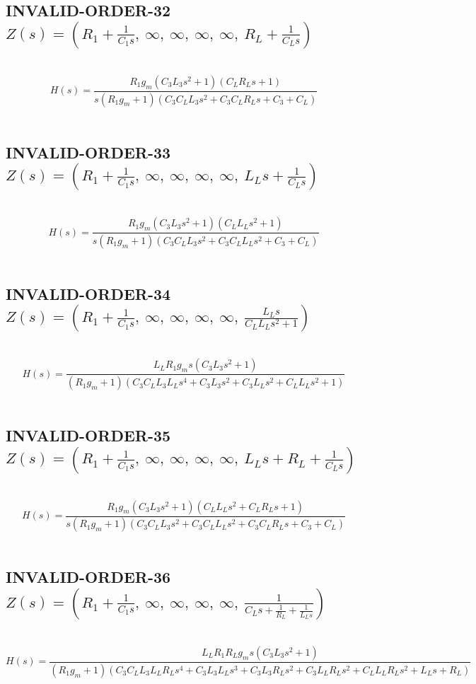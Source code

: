 \documentclass{article}
\begin{document}
\subsection{INVALID-ORDER-32 $Z(s) = \left( R_{1} + \frac{1}{C_{1} s}, \  \infty, \  \infty, \  \infty, \  \infty, \  R_{L} + \frac{1}{C_{L} s}\right)$ } \ 
\textbf{\[H(s) = \frac{R_{1} g_{m} \left(C_{3} L_{3} s^{2} + 1\right) \left(C_{L} R_{L} s + 1\right)}{s \left(R_{1} g_{m} + 1\right) \left(C_{3} C_{L} L_{3} s^{2} + C_{3} C_{L} R_{L} s + C_{3} + C_{L}\right)}\] } \ 
\subsection{INVALID-ORDER-33 $Z(s) = \left( R_{1} + \frac{1}{C_{1} s}, \  \infty, \  \infty, \  \infty, \  \infty, \  L_{L} s + \frac{1}{C_{L} s}\right)$ } \ 
\textbf{\[H(s) = \frac{R_{1} g_{m} \left(C_{3} L_{3} s^{2} + 1\right) \left(C_{L} L_{L} s^{2} + 1\right)}{s \left(R_{1} g_{m} + 1\right) \left(C_{3} C_{L} L_{3} s^{2} + C_{3} C_{L} L_{L} s^{2} + C_{3} + C_{L}\right)}\] } \ 
\subsection{INVALID-ORDER-34 $Z(s) = \left( R_{1} + \frac{1}{C_{1} s}, \  \infty, \  \infty, \  \infty, \  \infty, \  \frac{L_{L} s}{C_{L} L_{L} s^{2} + 1}\right)$ } \ 
\textbf{\[H(s) = \frac{L_{L} R_{1} g_{m} s \left(C_{3} L_{3} s^{2} + 1\right)}{\left(R_{1} g_{m} + 1\right) \left(C_{3} C_{L} L_{3} L_{L} s^{4} + C_{3} L_{3} s^{2} + C_{3} L_{L} s^{2} + C_{L} L_{L} s^{2} + 1\right)}\] } \ 
\subsection{INVALID-ORDER-35 $Z(s) = \left( R_{1} + \frac{1}{C_{1} s}, \  \infty, \  \infty, \  \infty, \  \infty, \  L_{L} s + R_{L} + \frac{1}{C_{L} s}\right)$ } \ 
\textbf{\[H(s) = \frac{R_{1} g_{m} \left(C_{3} L_{3} s^{2} + 1\right) \left(C_{L} L_{L} s^{2} + C_{L} R_{L} s + 1\right)}{s \left(R_{1} g_{m} + 1\right) \left(C_{3} C_{L} L_{3} s^{2} + C_{3} C_{L} L_{L} s^{2} + C_{3} C_{L} R_{L} s + C_{3} + C_{L}\right)}\] } \ 
\subsection{INVALID-ORDER-36 $Z(s) = \left( R_{1} + \frac{1}{C_{1} s}, \  \infty, \  \infty, \  \infty, \  \infty, \  \frac{1}{C_{L} s + \frac{1}{R_{L}} + \frac{1}{L_{L} s}}\right)$ } \ 
\textbf{\[H(s) = \frac{L_{L} R_{1} R_{L} g_{m} s \left(C_{3} L_{3} s^{2} + 1\right)}{\left(R_{1} g_{m} + 1\right) \left(C_{3} C_{L} L_{3} L_{L} R_{L} s^{4} + C_{3} L_{3} L_{L} s^{3} + C_{3} L_{3} R_{L} s^{2} + C_{3} L_{L} R_{L} s^{2} + C_{L} L_{L} R_{L} s^{2} + L_{L} s + R_{L}\right)}\] } \ 
\end{document}
